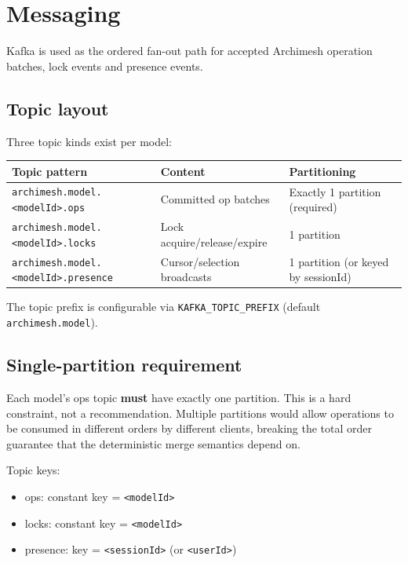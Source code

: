 \section{Messaging}
\label{sec:Messaging}

Kafka is used as the ordered fan-out path for accepted Archimesh operation
batches, lock events and presence events.

\subsection{Topic layout}

Three topic kinds exist per model:

\begin{longtable}{p{46mm}p{54mm}p{54mm}}
\toprule
Topic pattern & Content & Partitioning \\
\midrule
\texttt{archimesh.model.<modelId>.ops} & Committed op batches &
  Exactly 1 partition (required) \\
\texttt{archimesh.model.<modelId>.locks} & Lock acquire/release/expire &
  1 partition \\
\texttt{archimesh.model.<modelId>.presence} & Cursor/selection broadcasts &
  1 partition (or keyed by sessionId) \\
\bottomrule
\end{longtable}

The topic prefix is configurable via \texttt{KAFKA\_TOPIC\_PREFIX} (default
\texttt{archimesh.model}).

\subsection{Single-partition requirement}

Each model's ops topic \textbf{must} have exactly one partition. This is a
hard constraint, not a recommendation. Multiple partitions would allow
operations to be consumed in different orders by different clients, breaking
the total order guarantee that the deterministic merge semantics depend on.

Topic keys:

\begin{itemize}
\item ops: constant key = \texttt{<modelId>}
\item locks: constant key = \texttt{<modelId>}
\item presence: key = \texttt{<sessionId>} (or \texttt{<userId>})
\end{itemize}

